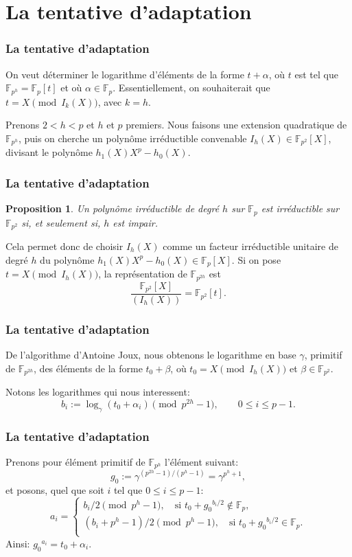 \documentclass{beamer}
\newtheorem{prop}[theo]{Proposition}
\theoremstyle{definition}
\theoremstyle{remark}
\def\gf #1{\mathbb{F}_{#1}}
\begin{document}
\section{La tentative d'adaptation}
\begin{frame}
  \frametitle{La tentative d'adaptation}
   On veut déterminer le logarithme d'éléments de la forme $t + \alpha$, où $t$ est tel que $\gf{p^h} = \gf{p}[t]$ et où $\alpha \in \gf{p}$. Essentiellement, on souhaiterait que $t = X \pmod{I_k(X)}$, avec $k = h$.

 Prenons $2 < h < p$ et $h$ et $p$ premiers. Nous faisons une extension quadratique de $\gf{p^h}$, puis on cherche un polynôme irréductible convenable $I_h(X)\in\gf{p^2}[X]$, divisant le polynôme $h_1(X)X^p - h_0(X)$.
\end{frame}

\begin{frame}
  \frametitle{La tentative d'adaptation}
  \begin{prop}
    Un polynôme irréductible de degré $h$ sur $\gf{p}$ est irréductible sur $\gf{p^2}$ si, et seulement si, $h$ est impair.
  \end{prop}
  Cela permet donc de choisir $I_h(X)$ comme un facteur irréductible unitaire de degré $h$ du polynôme $h_1(X)X^p-h_0(X) \in \gf{p}[X]$. Si on pose $t = X \pmod{I_h(X)}$, la représentation de $\gf{p^{2h}}$ est $$\frac{\gf{p^2}[X]}{(I_h(X))} = \gf{p^2}[t].$$
\end{frame}

\begin{frame}
  \frametitle{La tentative d'adaptation}
  De l'algorithme d'Antoine Joux, nous obtenons le logarithme en base $\gamma$, primitif de $\gf{p^{2h}}$, des éléments de la forme ${t_0} + \beta$, où ${t_0} = X \pmod{I_h(X)}$ et $\beta \in \gf{p^2}$. 
  
  Notons les logarithmes qui nous interessent:
  $$b_i := \log_\gamma\left({t_0} + \alpha_{i}\right) \pmod{p^{2h}-1}, \qquad 0 \leqslant i \leqslant p-1.$$
\end{frame}

\begin{frame}
  \frametitle{La tentative d'adaptation}
  Prenons pour élément primitif de $\gf{p^{h}}$ l'élément suivant:
  $$g_0 := \gamma^{(p^{2h}-1)/(p^h-1)}=\gamma^{p^h+1},$$
  et posons, quel que soit $i$ tel que $0 \leqslant i \leqslant p-1$:
 $$a_i = \left\{\begin{array}{l}
 b_i / 2 \pmod{p^h-1}, \quad \text{si } {t_0} + {g_0}^{b_i/2} \not\in \gf{p}, \\
 (b_i + p^h - 1) / 2 \pmod{p^h-1}, \quad \text{si } {t_0} + {g_0}^{b_i/2} \in \gf{p}. \\
  \end{array}\right.$$
  Ainsi: ${g_0}^{a_i} = t_0 + \alpha_i.$
\end{frame}
\end{document}
